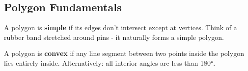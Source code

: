 \subsection{Polygon Fundamentals}
\label{ssec:polygon_fundamentals}

\begin{definition}
A polygon is \textbf{simple} if its edges don't intersect except at vertices. Think of a rubber band stretched around pins - it naturally forms a simple polygon.
\end{definition}

\begin{visualexample}
\begin{center}
\begin{tikzpicture}
\end{tikzpicture}
\end{center}
\end{visualexample}

\begin{definition}
A polygon is \textbf{convex} if any line segment between two points inside the polygon lies entirely inside. Alternatively: all interior angles are less than 180°.
\end{definition} 